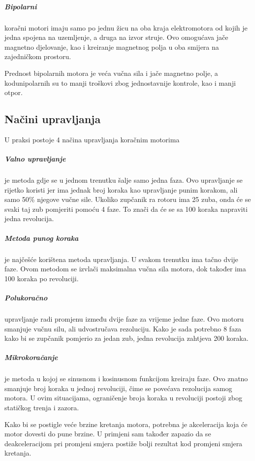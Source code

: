 \documentclass[../Document.tex]{subfiles}
\begin{document}

\subparagraph{Bipolarni} \noindent koračni motori imaju samo po jednu žicu na oba kraja elektromotora od kojih je jedna spojena na uzemljenje, a druga na izvor struje. Ovo omogućava jače magnetno djelovanje, kao i kreiranje magnetnog polja u oba smijera na zajedničkom prostoru.\\


\noindent Prednost bipolarnih motora je veća vučna sila i jače magnetno polje, a kodunipolarnih su to manji troškovi zbog jednostavnije kontrole, kao i manji otpor.

\subsection{Načini upravljanja}
U praksi postoje 4 načina upravljanja koračnim motorima

\subparagraph{Valno upravljanje} je metoda gdje se u jednom trenutku šalje samo jedna faza. Ovo upravljanje se rijetko koristi jer ima jednak broj koraka kao upravljanje punim korakom, ali samo 50\% njegove vučne sile. Ukoliko zupčanik ra rotoru ima 25 zuba, onda će se svaki taj zub pomjeriti pomoću 4 faze. To znači da će se sa 100 koraka napraviti jedna revolucija.\\

\subparagraph{Metoda punog koraka} je najčešće korištena metoda upravljanja. U svakom trenutku ima tačno dvije faze. Ovom metodom se izvlači maksimalna vučna sila motora, dok također ima 100 koraka po revoluciji.\\


\subparagraph{Polukoračno} upravljanje radi promjenu između dvije faze za vrijeme jedne faze. Ovo motoru smanjuje vučnu silu, ali udvostručava rezoluciju. Kako je sada potrebno 8 faza kako bi se zupčanik pomjerio za jedan zub, jedna  revolucija zahtjeva 200 koraka.


\subparagraph{Mikrokoračanje} je metoda u kojoj se sinusnom i kosinusnom funkcijom kreiraju faze. Ovo znatno smanjuje broj koraka u jednoj revoluciji, čime se povećava rezolucija samog motora. U ovim situacijama, ograničenje broja koraka u revoluciji postoji zbog statičkog trenja i zazora.

\noindent Kako bi se postigle veće brzine kretanja motora, potrebna je akceleracija koja će motor dovesti do pune brzine. U primjeni sam također zapazio da se deakceleracijom pri promjeni smjera postiže bolji rezultat kod promjeni smjera kretanja.
\end{document}
